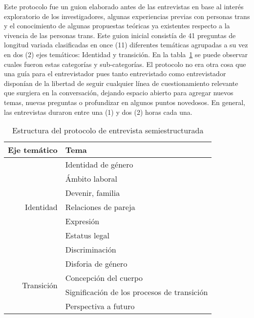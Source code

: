 Este protocolo fue un guion elaborado antes de las entrevistas en base al
interés exploratorio de los investigadores, algunas experiencias previas con
personas trans y el conocimiento de algunas propuestas teóricas ya existentes
respecto a la vivencia de las personas trans.
Este guion inicial consistía de 41 preguntas de longitud variada clasificadas en
once (11) diferentes temáticas agrupadas a su vez en dos (2) ejes temáticos:
Identidad y transición.
En la tabla~\ref{tab:protocolo} se puede observar cuales fueron estas categorías y
sub-categorías.
El protocolo no era otra cosa que una guía para el entrevistador pues tanto
entrevistado como entrevistador disponían de la libertad de seguir cualquier
línea de cuestionamiento relevante que surgiera en la conversación, dejando
espacio abierto para agregar nuevos temas, nuevas preguntas o profundizar en
algunos puntos novedosos.
En general, las entrevistas duraron entre una (1) y dos (2) horas cada una.

\begin{table}[]
\centering
\caption{Estructura del protocolo de entrevista semiestructurada}\label{tab:protocolo}
\begin{tabularx}{0.7\textwidth}{@{}rl@{}}
\toprule
Eje temático                & Tema                                        \\ \midrule
\multirow{7}{*}{Identidad}  & Identidad de género                         \\
                            & Ámbito laboral                              \\
                            & Devenir, familia                            \\
                            & Relaciones de pareja                        \\
                            & Expresión                                   \\
                            & Estatus legal                               \\
                            & Discriminación                              \\
\midrule
\multirow{4}{*}{Transición} & Disforia de género                          \\
                            & Concepción del cuerpo                       \\
                            & Significación de los procesos de transición \\
                            & Perspectiva a futuro                        \\
\bottomrule
\end{tabularx}
\end{table}

